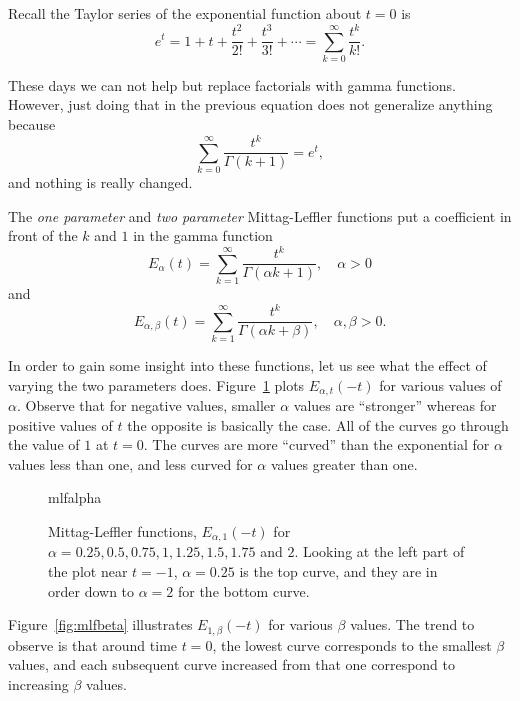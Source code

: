     Recall the Taylor series of the exponential function about $t=0$ is
    \begin{equation*}
      e^{t} = 1 + t + \frac{t^2}{2!} + \frac{t^3}{3!} + \cdots = \sum_{k=0}^\infty \frac{t^k}{k!}.
    \end{equation*}

    These days we can not help but replace factorials with gamma functions. However, just doing that in the previous equation does not generalize anything because
    \begin{equation*}
      \sum_{k=0}^\infty \frac{t^k}{\Gamma \left( k + 1 \right)} = e^t,
    \end{equation*}
    and nothing is really changed. 

    The \emph{one parameter} and \emph{two parameter} Mittag-Leffler functions put a coefficient in front of the $k$ and $1$ in the gamma function
    \begin{equation}
      \boxed{ E_\alpha(t) = \sum_{k=1}^\infty \frac{t^k}{\Gamma \left( \alpha k + 1 \right)}, \quad \alpha > 0 }
      \label{eq:mlone}
    \end{equation}
    and
    \begin{equation}
      \boxed{  E_{\alpha, \beta}(t) = \sum_{k=1}^\infty \frac{t^k}{\Gamma \left( \alpha k + \beta \right)}, \quad \alpha, \beta > 0. }
      \label{eq:mltwo}
    \end{equation}

    In order to gain some insight into these functions, let us see what the effect of varying the two parameters does. Figure~\ref{fig:mlfalpha} plots $E_{\alpha,t}(-t)$ for various values of $\alpha$. Observe that for negative values, smaller $\alpha$ values are ``stronger'' whereas for positive values of $t$ the opposite is basically the case. All of the curves go through the value of $1$ at $t=0$. The curves are more ``curved'' than the exponential for $\alpha$ values less than one, and less curved for $\alpha$ values greater than one.

    \begin{figure}
      \centering
      {mlfalpha}
      \caption{Mittag-Leffler functions, $E_{\alpha,1}(-t)$ for $\alpha = 0.25, 0.5, 0.75, 1, 1.25, 1.5, 1.75$ and $2$. Looking at the left part of the plot near $t = -1$, $\alpha = 0.25$ is the top curve, and they are in order down to $\alpha = 2$ for the bottom curve.}
      \label{fig:mlfalpha}
    \end{figure}

    Figure~\ref{fig:mlfbeta} illustrates $E_{1,\beta}(-t)$ for various $\beta$ values. The trend to observe is that around time $t=0$, the lowest curve corresponds to the smallest $\beta$ values, and each subsequent curve increased from that one correspond to increasing $\beta$ values. 

